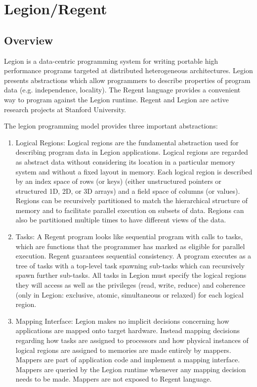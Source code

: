 \section{Legion/Regent}

\subsection{Overview}

Legion is a data-centric programming system for writing portable high performance programs targeted at distributed heterogeneous architectures.
Legion presents abstractions which allow programmers to describe properties of program data (e.g. independence, locality). The Regent language provides a convenient way to program against the Legion runtime. Regent and Legion are active research projects at Stanford University.	

The legion programming model provides three important abstractions: 
\begin{enumerate}
\item Logical Regions: Logical regions are the fundamental abstraction used for describing program data in Legion applications. Logical regions are regarded as abstract data without considering its location in a particular memory system and without a fixed layout in memory. Each logical region is described by an index space of rows (or keys) (either unstructured pointers or structured 1D, 2D, or 3D arrays) and a field space of columns (or values). Regions can be recursively partitioned to match the hierarchical structure of memory and to facilitate parallel execution on subsets of data. Regions can also be partitioned multiple times to have different views of the data.  
\item Tasks: A Regent program looks like sequential program with calls to tasks, which are functions that the programmer has marked as eligible for parallel execution. Regent guarantees sequential consistency. A program executes as a tree of tasks with a top-level task spawning sub-tasks which can recursively spawn further sub-tasks. All tasks in Legion must specify the logical regions they will access as well as the privileges (read, write, reduce) and coherence (only in Legion: exclusive, atomic, simultaneous or relaxed) for each logical region.
\item Mapping Interface: Legion makes no implicit decisions concerning how applications are mapped onto target hardware. Instead mapping decisions regarding how tasks are assigned to processors and how physical instances of logical regions are assigned to memories are made entirely by mappers. Mappers are part of application code and implement a mapping interface. Mappers are queried by the Legion runtime whenever any mapping decision needs to be made. Mappers are not exposed to Regent language.
\end{enumerate}

